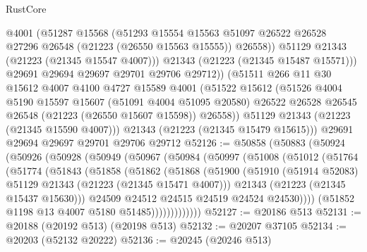 \begin{lexlean}{RustCore}
\begin{coremodule}
              @4001
              (@51287
                @15568
                (@51293
                  @15554
                  @15563
                  @51097
                  @26522
                  @26528
                  @27296
                  @26548
                  (@21223 (@26550 @15563 @15555))
                  @26558))
              @51129
              @21343
              (@21223 (@21345 @15547 @4007)))
            @21343
            (@21223 (@21345 @15487 @15571)))
          @29691
          @29694
          @29697
          @29701
          @29706
          @29712))
      (@51511
        @266
        @11
        @30
        @15612
        @4007
        @4100
        @4727
        @15589
        @4001
        (@51522
          @15612
          (@51526
            @4004
            @5190
            @15597
            @15607
            (@51091 @4004 @51095 @20580)
            @26522
            @26528
            @26545
            @26548
            (@21223 (@26550 @15607 @15598))
            @26558))
        @51129
        @21343
        (@21223 (@21345 @15590 @4007)))
      @21343
      (@21223 (@21345 @15479 @15615)))
    @29691
    @29694
    @29697
    @29701
    @29706
    @29712
@52126 := @50858
    (@50883
      (@50924
        (@50926
          (@50928
            (@50949
              (@50967
                (@50984
                  (@50997
                    (@51008
                      (@51012
                        (@51764
                          (@51774
                            (@51843
                              (@51858
                                (@51862
                                  (@51868
                                    (@51900
                                      (@51910
                                        (@51914 @52083)
                                        @51129
                                        @21343
                                        (@21223 (@21345 @15471 @4007)))
                                      @21343
                                      (@21223 (@21345 @15437 @15630)))
                                    @24509
                                    @24512
                                    @24515
                                    @24519
                                    @24524
                                    @24530))))
                            (@51852 @1198 @13 @4007 @5180 @51485)))))))))))))
@52127 := @20186 @513
@52131 := @20188 (@20192 @513) (@20198 @513)
@52132 := @20207 @37105
@52134 := @20203 (@52132 @20222)
@52136 := @20245 (@20246 @513)

\end{coremodule}
\end{lexlean}
